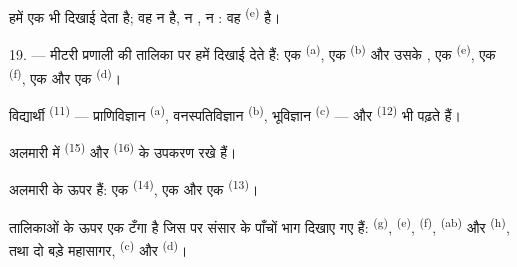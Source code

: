 हमें एक  भी दिखाई देता है; वह न  है, न
, न : वह  \textsuperscript{(e)} है।

19. --- मीटरी प्रणाली की तालिका पर हमें दिखाई देते हैं: एक 
\textsuperscript{(a)}, एक  \textsuperscript{(b)} और उसके ,
एक  \textsuperscript{(e)}, एक  \textsuperscript{(f)}, एक
 और एक  \textsuperscript{(d)}।

विद्यार्थी  \textsuperscript{(11)} --- प्राणिविज्ञान
\textsuperscript{(a)}, वनस्पतिविज्ञान \textsuperscript{(b)}, भूविज्ञान
\textsuperscript{(c)} --- और  \textsuperscript{(12)} भी पढ़ते हैं।

अलमारी में  \textsuperscript{(15)} और 
\textsuperscript{(16)} के उपकरण रखे हैं।

अलमारी के ऊपर हैं: एक  \textsuperscript{(14)}, एक  और
एक  \textsuperscript{(13)}।

तालिकाओं के ऊपर एक  टँगा है जिस पर संसार के पाँचों भाग दिखाए
गए हैं:  \textsuperscript{(g)},  \textsuperscript{(e)},
 \textsuperscript{(f)},  \textsuperscript{(ab)} और
 \textsuperscript{(h)}, तथा दो बड़े महासागर, 
\textsuperscript{(c)} और  \textsuperscript{(d)}।
\VUsaut{6.0mm}
\VUfilet{22mm}
